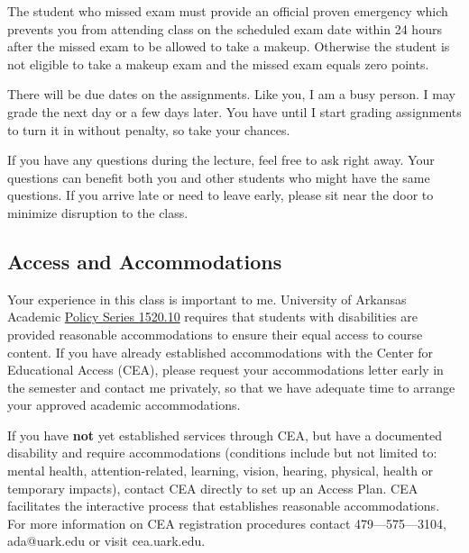 \documentclass[12pt]{article}
\begin{document}
The student who missed exam must provide an official proven emergency which prevents you from attending class on the scheduled exam date within 24 hours after the missed exam to be allowed to take a makeup. Otherwise the student is not eligible to take a makeup exam and the missed exam equals zero points.

There will be due dates on the assignments. Like you, I am a busy person. I may grade the next day or a few days later. You have until I start grading assignments to turn it in without penalty, so take your chances. 

If you have any questions during the lecture, feel free to ask right away. Your questions can benefit both you and other students who might have the same questions. If you arrive late or need to leave early, please sit near the door to minimize disruption to the class.

\subsection*{Access and Accommodations}

Your experience in this class is important to me. University of Arkansas Academic \href{https://policies.uark.edu/academic/152010.php}{Policy Series 1520.10} requires that students with disabilities are provided reasonable accommodations to ensure their equal access to course content. If you have already established accommodations with the Center for Educational Access (CEA), please request your accommodations letter early in the semester and contact me privately, so that we have adequate time to arrange your approved academic accommodations.

If you have \textbf{not} yet established services through CEA, but have a documented disability and require accommodations (conditions include but not limited to: mental health, attention-related, learning, vision, hearing, physical, health  or temporary impacts), contact CEA directly to set up an Access Plan. CEA facilitates the interactive process that establishes reasonable accommodations.  For more information on CEA registration procedures contact 479—575—3104, ada@uark.edu or visit cea.uark.edu.

\end{document}
